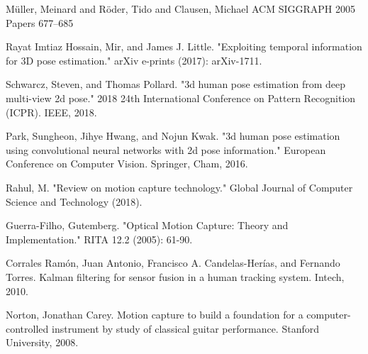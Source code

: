 \begin{thebibliography}{9}

M{\"u}ller, Meinard and R{\"o}der, Tido and Clausen, Michael ACM SIGGRAPH 2005 Papers 677--685

Rayat Imtiaz Hossain, Mir, and James J. Little. "Exploiting temporal information for 3D pose estimation." arXiv e-prints (2017): arXiv-1711.

Schwarcz, Steven, and Thomas Pollard. "3d human pose estimation from deep multi-view 2d pose." 2018 24th International Conference on Pattern Recognition (ICPR). IEEE, 2018.

Park, Sungheon, Jihye Hwang, and Nojun Kwak. "3d human pose estimation using convolutional neural networks with 2d pose information." European Conference on Computer Vision. Springer, Cham, 2016.

Rahul, M. "Review on motion capture technology." Global Journal of Computer Science and Technology (2018).

Guerra-Filho, Gutemberg. "Optical Motion Capture: Theory and Implementation." RITA 12.2 (2005): 61-90.

Corrales Ramón, Juan Antonio, Francisco A. Candelas-Herías, and Fernando Torres. Kalman filtering for sensor fusion in a human tracking system. Intech, 2010.

 Norton, Jonathan Carey. Motion capture to build a foundation for a computer-controlled instrument by study of classical guitar performance. Stanford University, 2008.



\end{thebibliography}

